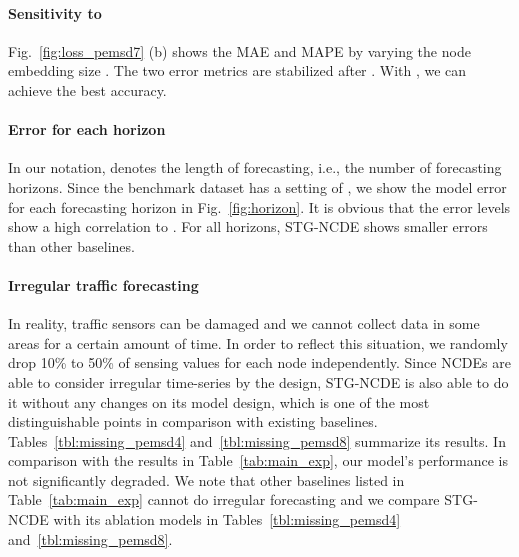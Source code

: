 \documentclass[letterpaper]{article} \usepackage{aaai22}  \usepackage{times}  \usepackage{helvet}  \usepackage{courier}  \usepackage[hyphens]{url}  \usepackage{graphicx} \urlstyle{rm} \def\UrlFont{\rm}  \usepackage{natbib}  \usepackage{caption} \DeclareCaptionStyle{ruled}{labelfont=normalfont,labelsep=colon,strut=off} \frenchspacing  \setlength{\pdfpagewidth}{8.5in}  \setlength{\pdfpageheight}{11in}  \usepackage{stfloats}
\begin{document}
\paragraph{Sensitivity to } Fig.~\ref{fig:loss_pemsd7} (b) shows the MAE and MAPE by varying the node embedding size . The two error metrics are stabilized after . With , we can achieve the best accuracy.

\paragraph{Error for each horizon} In our notation,  denotes the length of forecasting, i.e., the number of forecasting horizons. Since the benchmark dataset has a setting of , we show the model error for each forecasting horizon in Fig.~\ref{fig:horizon}. It is obvious that the error levels show a high correlation to . For all horizons, STG-NCDE shows smaller errors than other baselines.

\paragraph{Irregular traffic forecasting} In reality, traffic sensors can be damaged and we cannot collect data in some areas for a certain amount of time. In order to reflect this situation, we randomly drop 10\% to 50\% of sensing values for each node independently. Since NCDEs are able to consider irregular time-series by the design, STG-NCDE is also able to do it without any changes on its model design, which is one of the  most distinguishable points in comparison with existing baselines. Tables~\ref{tbl:missing_pemsd4} and~\ref{tbl:missing_pemsd8} summarize its results. In comparison with the results in Table~\ref{tab:main_exp}, our model's performance is not significantly degraded. We note that other baselines listed in Table~\ref{tab:main_exp} cannot do irregular forecasting and we compare STG-NCDE with its ablation models in Tables~\ref{tbl:missing_pemsd4} and~\ref{tbl:missing_pemsd8}.
\end{document}
